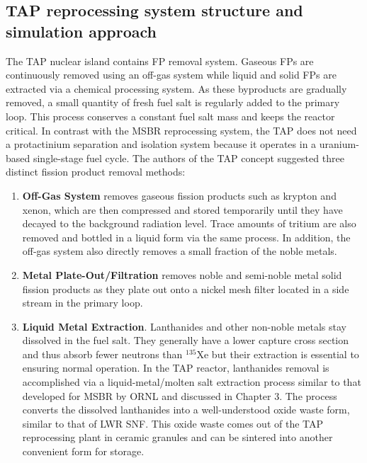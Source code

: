 \documentclass[12pt]{article} %
\begin{document}
\subsection{TAP reprocessing system structure and simulation approach}
The \gls{TAP} nuclear island contains \gls{FP} removal system. Gaseous 
\glspl{FP} are continuously removed using an off-gas system while liquid 
and solid \glspl{FP} are extracted via a chemical processing system. As 
these byproducts are gradually removed, a small quantity 
of fresh fuel salt is regularly added to the primary loop. This process conserves a 
constant fuel salt mass and keeps the reactor critical. In contrast with the \gls{MSBR} 
reprocessing system, the \gls{TAP} does not need a protactinium separation and isolation 
system because it operates in a uranium-based single-stage fuel cycle. The authors of 
the \gls{TAP} concept suggested three distinct fission product removal methods: 
\begin{enumerate}
	\item \textbf{Off-Gas System} removes gaseous fission products such as krypton 
and xenon, 
which are then compressed and stored temporarily until they have decayed to the background 
radiation level. Trace amounts of tritium are also removed and bottled in a liquid form 
via the same process. In addition, the off-gas system also directly removes a small 
fraction of the noble metals.
	\item \textbf{Metal Plate-Out/Filtration} removes noble and semi-noble metal 
solid fission 
products as they plate out onto a nickel mesh filter located in a side stream in the 
primary loop.
	\item \textbf{Liquid Metal Extraction}. Lanthanides and other non-noble 
metals stay dissolved in the fuel salt. They generally have a lower capture cross 
section and thus absorb fewer neutrons than $^{135}$Xe but their extraction is essential 
to ensuring normal operation. In the \gls{TAP} reactor, lanthanides removal is
accomplished via 
a liquid-metal/molten salt extraction process similar to that developed for \gls{MSBR} 
by \gls{ORNL} \cite{robertson_conceptual_1971} and discussed in Chapter 3. The process 
converts the dissolved lanthanides into a well-understood oxide waste form, similar to 
that of \gls{LWR} \gls{SNF}. This oxide waste comes out of the \gls{TAP} reprocessing 
plant in ceramic granules and can be sintered into another convenient form for storage.
\end{enumerate}
\end{document}
